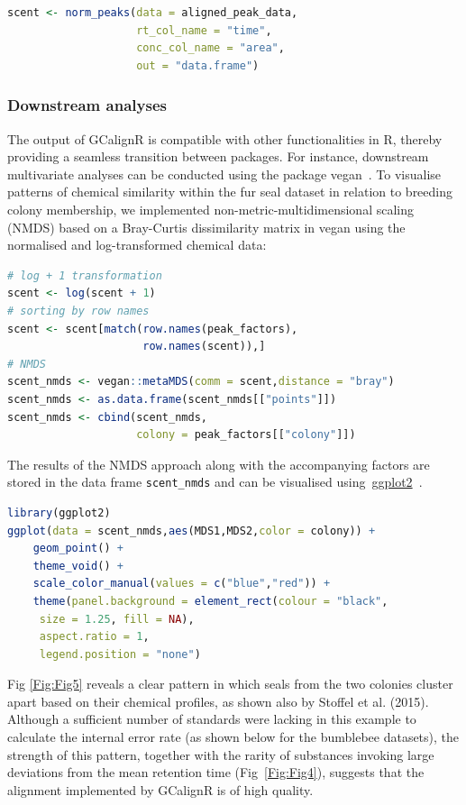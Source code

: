 \documentclass[10pt,letterpaper]{article}
\begin{document}
\begin{lstlisting}[language=R]
scent <- norm_peaks(data = aligned_peak_data,
                    rt_col_name = "time",
                    conc_col_name = "area",
                    out = "data.frame") 
\end{lstlisting}

\subsubsection*{Downstream analyses}
The output of GCalignR is compatible with other functionalities in R, thereby providing a seamless transition between packages. For instance, downstream multivariate analyses can be conducted using the package vegan~\cite{Oksanen.2016}. To visualise patterns of chemical similarity within the fur seal dataset in relation to breeding colony membership, we implemented non-metric-multidimensional scaling (NMDS) based on a Bray-Curtis dissimilarity matrix in vegan using the normalised and log-transformed chemical data:

\begin{lstlisting}[language=R]
# log + 1 transformation
scent <- log(scent + 1) 
# sorting by row names
scent <- scent[match(row.names(peak_factors),
                     row.names(scent)),] 
# NMDS
scent_nmds <- vegan::metaMDS(comm = scent,distance = "bray") 
scent_nmds <- as.data.frame(scent_nmds[["points"]]) 
scent_nmds <- cbind(scent_nmds,
                    colony = peak_factors[["colony"]]) 
\end{lstlisting}

The results of the NMDS approach along with the accompanying factors are stored in the data frame \texttt{scent\_nmds} and can be visualised using~\href{https://CRAN.R-project.org/package=ggplot2}{ggplot2}~\cite{Wickham.2009}.

\begin{lstlisting}[language=R]
library(ggplot2) 
ggplot(data = scent_nmds,aes(MDS1,MDS2,color = colony)) +
    geom_point() + 
    theme_void() + 
    scale_color_manual(values = c("blue","red")) +
    theme(panel.background = element_rect(colour = "black",
     size = 1.25, fill = NA),
     aspect.ratio = 1,
     legend.position = "none")
\end{lstlisting}

Fig \ref{Fig:Fig5} reveals a clear pattern in which seals from the two colonies cluster apart based on their chemical profiles, as shown also by Stoffel et al. (2015). Although a sufficient number of standards were lacking in this example to calculate the internal error rate (as shown below for the bumblebee datasets), the strength of this pattern, together with the rarity of substances invoking large deviations from the mean retention time (Fig~\ref{Fig:Fig4}), suggests that the alignment implemented by GCalignR is of high quality.\par
\end{document}
